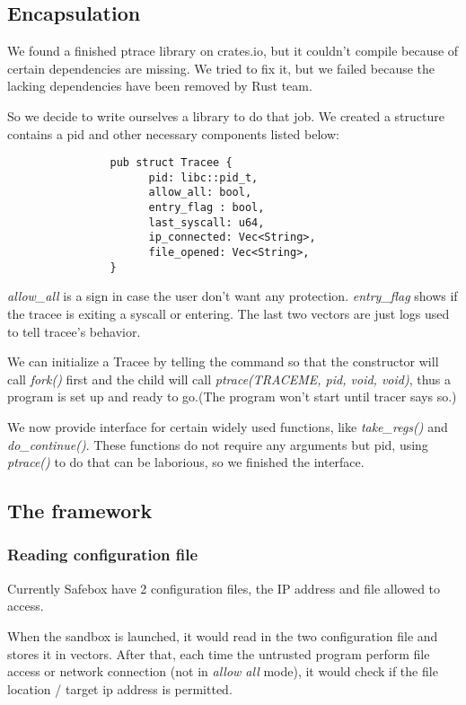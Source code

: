 \documentclass[conference,compsoc]{IEEEtran}
\begin{document}
	\subsection{Encapsulation}
		\par 
			We found a finished ptrace library on crates.io, but it couldn't compile because of certain dependencies are missing. 
			We tried to fix it, but we failed because the lacking dependencies have been removed by Rust team.
		\par
			So we decide to write ourselves a library to do that job. 
			We created a structure contains a pid and other necessary components listed below:
			\begin{verbatim}
				pub struct Tracee {
					  pid: libc::pid_t,
					  allow_all: bool,
					  entry_flag : bool,			
					  last_syscall: u64,
					  ip_connected: Vec<String>,
					  file_opened: Vec<String>,
				}
			\end{verbatim}
		\par
			\emph{allow\_all} is a sign in case the user don't want any protection. 
			\emph{entry\_flag} shows if the tracee is exiting a syscall or entering. 
			The last two vectors are just logs used to tell tracee's behavior.
		\par
			We can initialize a Tracee by telling the command so that the constructor will call \emph{fork()} first and the child will call \emph{ptrace(TRACEME, pid, void, void)}, thus a program is set up and ready to go.(The program won't start until tracer says so.)
		\par
			We now provide interface for certain widely used functions, like \emph{take\_regs()} and \emph{do\_continue()}. 
			These functions do not require any arguments but pid, using \emph{ptrace()} to do that can be laborious, so we finished the interface.
	\subsection{The framework}
		\subsubsection{Reading configuration file}
			Currently Safebox have 2 configuration files, the IP address and file allowed to access.
			\par
			When the sandbox is launched, it would read in the two configuration file and stores it in vectors. After that, each time the untrusted program perform file access or network connection (not in \emph{allow all} mode), it would check if the file location / target ip address is permitted.
\end{document}
